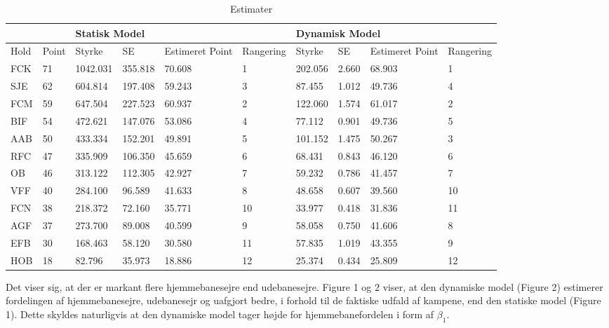 \documentclass[11pt,a4paper]{article}
\begin{document}
\begin{table}[ht]
\centering
\begin{adjustbox}{max width=\textwidth}
\begin{tabular}{|ll|llll|llll|}
\hline
\multicolumn{2}{|l|}{} & \multicolumn{4}{l|}{Statisk Model} & \multicolumn{4}{l|}{Dynamisk Model} \\
\hline
Hold & Point & Styrke & SE & Estimeret Point & Rangering & Styrke & SE & Estimeret Point & Rangering \\
  \hline
    FCK & 71 & 1042.031 & 355.818 & 70.608 & 1 & 202.056 & 2.660 & 68.903 & 1 \\
    SJE & 62 & 604.814 & 197.408 & 59.243 & 3 & 87.455 & 1.012 & 49.736 & 4 \\
    FCM & 59 & 647.504 & 227.523 & 60.937 & 2 & 122.060 & 1.574 & 61.017 & 2 \\
    BIF & 54 & 472.621 & 147.076 & 53.086 & 4 & 77.112 & 0.901 & 49.736 & 5 \\
    AAB & 50 & 433.334 & 152.201 & 49.891 & 5 & 101.152 & 1.475 & 50.267 & 3 \\
    RFC & 47 & 335.909 & 106.350 & 45.659 & 6 & 68.431 & 0.843 & 46.120 & 6 \\
    OB  & 46 & 313.122 & 112.305 & 42.927 & 7 & 59.232 & 0.786 & 41.457 & 7 \\
    VFF & 40 & 284.100 & 96.589 & 41.633 & 8 & 48.658 & 0.607 & 39.560 & 10 \\
    FCN & 38 & 218.372 & 72.160 & 35.771 & 10 & 33.977 & 0.418 & 31.836 & 11 \\
    AGF & 37 & 273.700 & 89.008 & 40.599 & 9 & 58.058 & 0.750 & 41.606 & 8 \\
    EFB & 30 & 168.463 & 58.120 & 30.580 & 11 & 57.835 & 1.019 & 43.355 & 9 \\
    HOB & 18 & 82.796 & 35.973 & 18.886 & 12 & 25.374 & 0.434 & 25.809 & 12 \\
   \hline
\end{tabular}
\end{adjustbox}
\caption{\label{tab:Estimater}Estimater}
\end{table}
Det viser sig, at der er markant flere hjemmebanesejre end udebanesejre. Figure 1 og 2 viser, at den dynamiske model (Figure 2) estimerer fordelingen af hjemmebanesejre, udebanesejr og uafgjort bedre, i forhold til de faktiske udfald af kampene, end den statiske model (Figure 1). 
Dette skyldes naturligvis at den dynamiske model tager højde for hjemmebanefordelen i form af $\beta_1$.
\end{document}
